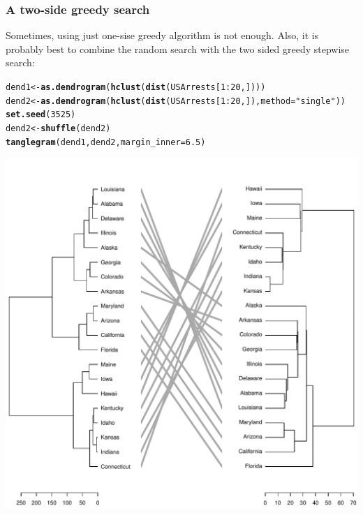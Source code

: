\documentclass[shortnames,nojss,article]{jss}\usepackage[]{graphicx}\usepackage[]{color}
\makeatletter
\def\maxwidth{ %
  \ifdim\Gin@nat@width>\linewidth
    \linewidth
  \else
    \Gin@nat@width
  \fi
}
\newcommand{\hlnum}[1]{\textcolor[rgb]{0.686,0.059,0.569}{#1}}%
\newcommand{\hlstr}[1]{\textcolor[rgb]{0.192,0.494,0.8}{#1}}%
\newcommand{\hlopt}[1]{\textcolor[rgb]{0,0,0}{#1}}%
\newcommand{\hlstd}[1]{\textcolor[rgb]{0.345,0.345,0.345}{#1}}%
\newcommand{\hlkwb}[1]{\textcolor[rgb]{0.69,0.353,0.396}{#1}}%
\newcommand{\hlkwc}[1]{\textcolor[rgb]{0.333,0.667,0.333}{#1}}%
\newcommand{\hlkwd}[1]{\textcolor[rgb]{0.737,0.353,0.396}{\textbf{#1}}}%
\newenvironment{kframe}{%
 \def\at@end@of@kframe{}%
 \ifinner\ifhmode%
  \def\at@end@of@kframe{\end{minipage}}%
  \begin{minipage}{\columnwidth}%
 \fi\fi%
 \def\FrameCommand##1{\hskip\@totalleftmargin \hskip-\fboxsep
 \colorbox{shadecolor}{##1}\hskip-\fboxsep
     \hskip-\linewidth \hskip-\@totalleftmargin \hskip\columnwidth}%
 \MakeFramed {\advance\hsize-\width
   \@totalleftmargin\z@ \linewidth\hsize
   \@setminipage}}%
 {\par\unskip\endMakeFramed%
 \at@end@of@kframe}
\newenvironment{knitrout}{}{} %
\makeatother
\begin{document}
\subsubsection{A two-side greedy search}

Sometimes, using just one-sise greedy algorithm is not enough. Also, it is probably best to combine the random search with the two sided greedy stepwise search:

\begin{knitrout}
\color{fgcolor}\begin{kframe}
\begin{alltt}
\hlstd{dend1} \hlkwb{<-} \hlkwd{as.dendrogram}\hlstd{(}\hlkwd{hclust}\hlstd{(}\hlkwd{dist}\hlstd{(USArrests[}\hlnum{1}\hlopt{:}\hlnum{20}\hlstd{, ])))}
\hlstd{dend2} \hlkwb{<-} \hlkwd{as.dendrogram}\hlstd{(}\hlkwd{hclust}\hlstd{(}\hlkwd{dist}\hlstd{(USArrests[}\hlnum{1}\hlopt{:}\hlnum{20}\hlstd{, ]),} \hlkwc{method} \hlstd{=} \hlstr{"single"}\hlstd{))}
\hlkwd{set.seed}\hlstd{(}\hlnum{3525}\hlstd{)}
\hlstd{dend2} \hlkwb{<-} \hlkwd{shuffle}\hlstd{(dend2)}
\hlkwd{tanglegram}\hlstd{(dend1, dend2,} \hlkwc{margin_inner} \hlstd{=} \hlnum{6.5}\hlstd{)}
\end{alltt}
\end{kframe}

{\centering \includegraphics[width=\maxwidth]{figure/untangle_step_rotate_2side_example1} 

}
\end{knitrout}
\end{document}

